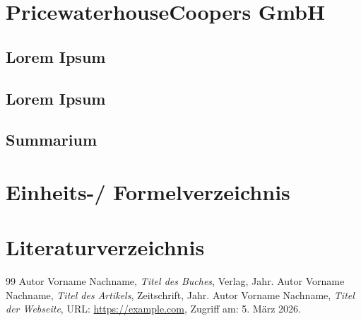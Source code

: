 \documentclass[12pt]{article} %
\begin{document}
\section{PricewaterhouseCoopers GmbH}
\subsection{Lorem Ipsum}
\subsection{Lorem Ipsum}
\subsection{Summarium}

\newpage

\newpage

\section{Einheits-/ Formelverzeichnis}

\section{Literaturverzeichnis}
\begin{thebibliography}{99}
     Autor Vorname Nachname, \textit{Titel des Buches}, Verlag, Jahr.
     Autor Vorname Nachname, \textit{Titel des Artikels}, Zeitschrift, Jahr.
     Autor Vorname Nachname, \textit{Titel der Webseite}, URL: \url{https://example.com}, Zugriff am: 5. März 2026.
\end{thebibliography}
\end{document}
